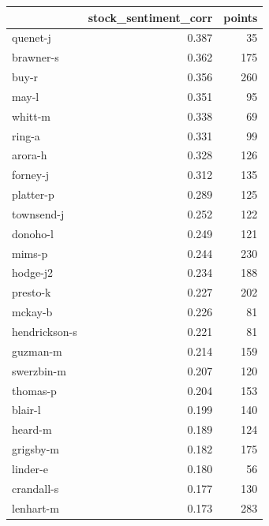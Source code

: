 \documentclass{vldb}
\begin{document}
\clearpage
\begin{appendix}

\begin{supertabular}{ l r r }
\toprule
{} &  stock\_sentiment\_corr &  points \\
\midrule
quenet-j       &                 0.387 &      35 \\
brawner-s      &                 0.362 &     175 \\
buy-r          &                 0.356 &     260 \\
may-l          &                 0.351 &      95 \\
whitt-m        &                 0.338 &      69 \\
ring-a         &                 0.331 &      99 \\
arora-h        &                 0.328 &     126 \\
forney-j       &                 0.312 &     135 \\
platter-p      &                 0.289 &     125 \\
townsend-j     &                 0.252 &     122 \\
donoho-l       &                 0.249 &     121 \\
mims-p         &                 0.244 &     230 \\
hodge-j2       &                 0.234 &     188 \\
presto-k       &                 0.227 &     202 \\
mckay-b        &                 0.226 &      81 \\
hendrickson-s  &                 0.221 &      81 \\
guzman-m       &                 0.214 &     159 \\
swerzbin-m     &                 0.207 &     120 \\
thomas-p       &                 0.204 &     153 \\
blair-l        &                 0.199 &     140 \\
heard-m        &                 0.189 &     124 \\
grigsby-m      &                 0.182 &     175 \\
linder-e       &                 0.180 &      56 \\
crandall-s     &                 0.177 &     130 \\
lenhart-m      &                 0.173 &     283 \\

\end{supertabular}
\end{appendix}
\end{document}
